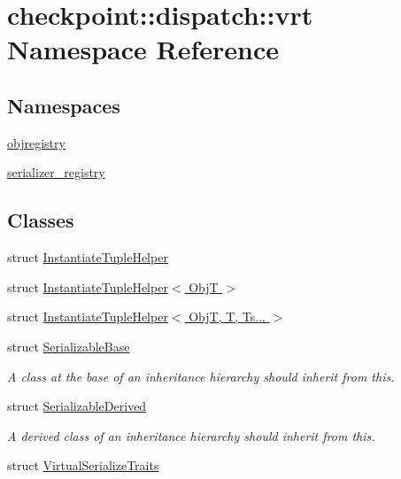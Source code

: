 \hypertarget{namespacecheckpoint_1_1dispatch_1_1vrt}{}\section{checkpoint\+:\+:dispatch\+:\+:vrt Namespace Reference}
\label{namespacecheckpoint_1_1dispatch_1_1vrt}
\subsection*{Namespaces}
\begin{DoxyCompactItemize}
\item 
 \hyperlink{namespacecheckpoint_1_1dispatch_1_1vrt_1_1objregistry}{objregistry}
\item 
 \hyperlink{namespacecheckpoint_1_1dispatch_1_1vrt_1_1serializer__registry}{serializer\+\_\+registry}
\end{DoxyCompactItemize}
\subsection*{Classes}
\begin{DoxyCompactItemize}
\item 
struct \hyperlink{structcheckpoint_1_1dispatch_1_1vrt_1_1_instantiate_tuple_helper}{Instantiate\+Tuple\+Helper}
\item 
struct \hyperlink{structcheckpoint_1_1dispatch_1_1vrt_1_1_instantiate_tuple_helper_3_01_obj_t_01_4}{Instantiate\+Tuple\+Helper$<$ Obj\+T $>$}
\item 
struct \hyperlink{structcheckpoint_1_1dispatch_1_1vrt_1_1_instantiate_tuple_helper_3_01_obj_t_00_01_t_00_01_ts_8_8_8_01_4}{Instantiate\+Tuple\+Helper$<$ Obj\+T, T, Ts... $>$}
\item 
struct \hyperlink{structcheckpoint_1_1dispatch_1_1vrt_1_1_serializable_base}{Serializable\+Base}
\begin{DoxyCompactList}\small\item\em A class at the base of an inheritance hierarchy should inherit from this. \end{DoxyCompactList}\item 
struct \hyperlink{structcheckpoint_1_1dispatch_1_1vrt_1_1_serializable_derived}{Serializable\+Derived}
\begin{DoxyCompactList}\small\item\em A derived class of an inheritance hierarchy should inherit from this. \end{DoxyCompactList}\item 
struct \hyperlink{structcheckpoint_1_1dispatch_1_1vrt_1_1_virtual_serialize_traits}{Virtual\+Serialize\+Traits}
\end{DoxyCompactItemize}
